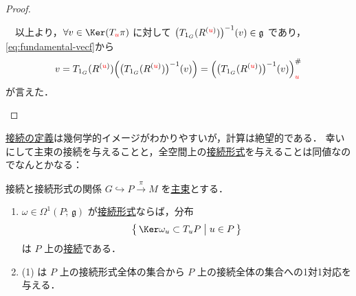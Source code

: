 \documentclass[TQFT_main]{subfiles}
\begin{document}
\begin{proof}
\begin{description}
        　以上より，$\forall v \in \Ker (T_{\textcolor{red}{u}} \pi)$ に対して $\bigl(T_{1_G} (R^{(\textcolor{red}{u})})\bigr)^{-1}(v) \in \mathfrak{g}$ であり，\eqref{eq:fundamental-vecf}から
        \begin{align}
            v = T_{1_G} (R^{(\textcolor{red}{u})}) \Bigl( \bigl(T_{1_G} (R^{(\textcolor{red}{u})})\bigr)^{-1}(v)\Bigr) = \Bigl(\bigl(T_{1_G} (R^{(\textcolor{red}{u})})\bigr)^{-1}(v)\Bigr)^\#_{\textcolor{red}{u}}
        \end{align}
        が言えた．
    \end{description}

\end{proof}

\hyperref[def:connection]{接続の定義}は幾何学的イメージがわかりやすいが，計算は絶望的である．
幸いにして主束の接続を与えることと，全空間上の\hyperref[def:connection]{接続形式}を与えることは同値なのでなんとかなる：

\begin{mytheo}[label=thm:connection-basic]{接続と接続形式の関係}
    $G \hookrightarrow P \xrightarrow{\pi} M$ を\hyperref[def.PFD]{主束}とする．
    \begin{enumerate}
        \item $\omega \in \Omega^1(P;\, \mathfrak{g})$ が\hyperref[def:connection]{接続形式}ならば，分布 
        \begin{align}
            \bigl\{\, \Ker \omega_u \subset T_u P\bigm| u \in P \,\bigr\} 
        \end{align}
        は $P$ 上の\hyperref[def:connection]{接続}である．
        \item (1) は $P$ 上の接続形式全体の集合から $P$ 上の接続全体の集合への1対1対応を与える．
    \end{enumerate}
\end{mytheo}
\end{document}
